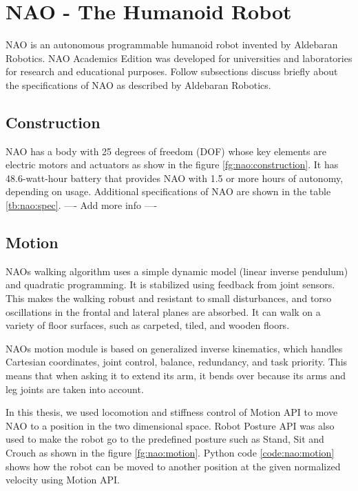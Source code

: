 \section{NAO - The Humanoid Robot} NAO is an autonomous programmable humanoid robot invented by Aldebaran Robotics. NAO Academics Edition was developed for universities and laboratories for research and educational purposes. Follow subsections discuss briefly about the specifications of NAO as described by Aldebaran Robotics.



\subsection{Construction} NAO has a body with 25 degrees of freedom (DOF) whose key elements are electric motors and actuators as show in the figure \ref{fg:nao:construction}. It has 48.6-watt-hour battery that provides NAO with 1.5 or more hours of autonomy, depending on usage. Additional specifications of NAO are shown in the table \ref{tb:nao:spec}. ---- Add more info ----



\subsection{Motion} NAOs walking algorithm uses a simple dynamic model (linear inverse pendulum) and quadratic programming. It is stabilized using feedback from joint sensors. This makes the walking robust and resistant to small disturbances, and torso oscillations in the frontal and lateral planes are absorbed. It can walk on a variety of floor surfaces, such as carpeted, tiled, and wooden floors. 

NAOs motion module is based on generalized inverse kinematics, which handles Cartesian coordinates, joint control, balance, redundancy, and task priority. This means that when asking it to extend its arm, it bends over because its arms and leg joints are taken into account.



In this thesis, we used locomotion and stiffness control of Motion API to move NAO to a position in the two dimensional space. Robot Posture API was also used to make the robot go to the predefined posture such as Stand, Sit and Crouch as shown in the figure \ref{fg:nao:motion}. Python code \ref{code:nao:motion} shows how the robot can be moved to another position at the given normalized velocity using Motion API. 

